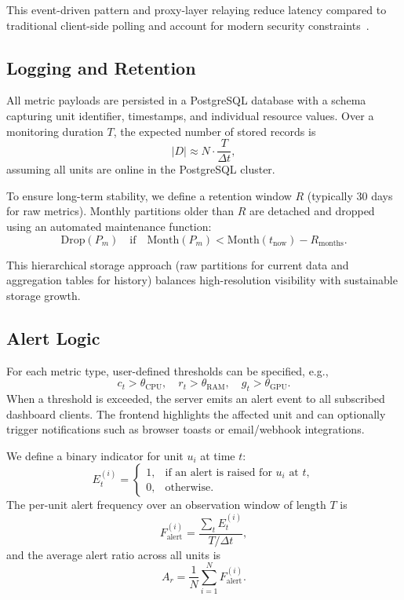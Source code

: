 \documentclass[conference]{IEEEtran}
\begin{document}
This event-driven pattern and proxy-layer relaying reduce latency compared to traditional client-side polling and account for modern security constraints~\cite{demirSocketIO,socketioDocs}.

\subsection{Logging and Retention}

All metric payloads are persisted in a PostgreSQL database with a schema capturing unit identifier, timestamps, and individual resource values. Over a monitoring duration $T$, the expected number of stored records is
\begin{equation}
  |D| \approx N \cdot \frac{T}{\Delta t},
\end{equation}
assuming all units are online in the PostgreSQL cluster.

To ensure long-term stability, we define a retention window $R$ (typically 30 days for raw metrics). Monthly partitions older than $R$ are detached and dropped using an automated maintenance function:
\begin{equation}
  \text{Drop}(P_m) \quad \text{if} \quad \text{Month}(P_m) < \text{Month}(t_{\text{now}}) - R_{\text{months}}.
\end{equation}

This hierarchical storage approach (raw partitions for current data and aggregation tables for history) balances high-resolution visibility with sustainable storage growth.

\subsection{Alert Logic}

For each metric type, user-defined thresholds can be specified, e.g.,
\begin{equation}
  c_t > \theta_{\text{CPU}}, \quad r_t > \theta_{\text{RAM}}, \quad g_t > \theta_{\text{GPU}}.
\end{equation}
When a threshold is exceeded, the server emits an alert event to all subscribed dashboard clients. The frontend highlights the affected unit and can optionally trigger notifications such as browser toasts or email/webhook integrations.

We define a binary indicator for unit $u_i$ at time $t$:
\begin{equation}
  E_t^{(i)} =
  \begin{cases}
    1, & \text{if an alert is raised for } u_i \text{ at } t,\\
    0, & \text{otherwise.}
  \end{cases}
\end{equation}
The per-unit alert frequency over an observation window of length $T$ is
\begin{equation}
  F_{\text{alert}}^{(i)} =
  \frac{\sum_t E_t^{(i)}}{T/\Delta t},
\end{equation}
and the average alert ratio across all units is
\begin{equation}
  A_r = \frac{1}{N} \sum_{i=1}^{N} F_{\text{alert}}^{(i)}.
\end{equation}
\end{document}
